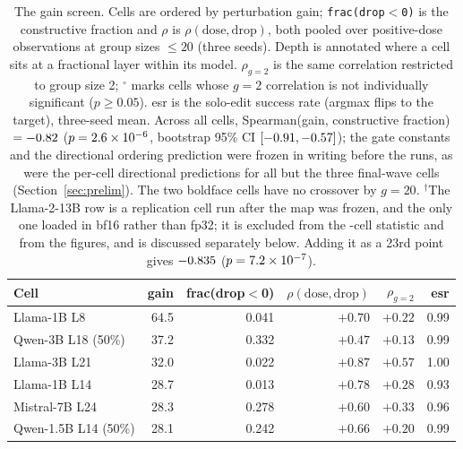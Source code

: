 \documentclass[preprint,12pt]{elsarticle}
\theoremstyle{definition}
\begin{document}
\begin{table}[t]
\centering
\caption{The gain screen. Cells are ordered by perturbation gain; \texttt{frac(drop$<$0)}
is the constructive fraction and $\rho$ is $\rho(\mathrm{dose},\mathrm{drop})$, both
pooled over positive-dose observations at group sizes $\leq 20$ (three seeds). Depth is
annotated where a cell sits at a fractional layer within its model. $\rho_{g=2}$ is
the same correlation restricted to group size 2; $^{\circ}$ marks cells whose
$g{=}2$ correlation is not individually significant ($p\geq0.05$). esr is the
solo-edit success rate (argmax flips to the target), three-seed mean.
Across all \nCells{} cells, Spearman(gain, constructive fraction) $=-0.82{}$
($p=2.6\times10^{-6}{}$, bootstrap 95\% CI $[-0.91,-0.57]{}$); the gate constants and the
directional ordering prediction were frozen in writing before the runs, as were the
per-cell directional predictions for all but the three final-wave cells
(Section~\ref{sec:prelim}). The two boldface cells have no crossover by $g{=}20$.
$^{\dagger}$The Llama-2-13B row is a replication cell run after the map was frozen, and
the only one loaded in bf16 rather than fp32; it is excluded from the \nCells{}-cell
statistic and from the figures, and is discussed separately below. Adding it as a 23rd
point gives $-0.835{}$ ($p=7.2\times10^{-7}{}$).}
\label{tab:gain}
{\small
\begin{tabular}{lrrrrr}
\toprule
Cell & gain & frac(drop$<$0) & $\rho(\mathrm{dose},\mathrm{drop})$ & $\rho_{g=2}$ & esr \\
\midrule
Llama-1B L8         & 64.5 & 0.041 & $+0.70$ & $+0.22$ & 0.99 \\
Qwen-3B L18 (50\%)  & 37.2 & 0.332 & $+0.47$ & $+0.13$ & 0.99 \\
Llama-3B L21        & 32.0 & 0.022 & $+0.87$ & $+0.57$ & 1.00 \\
Llama-1B L14        & 28.7 & 0.013 & $+0.78$ & $+0.28$ & 0.93 \\
Mistral-7B L24      & 28.3 & 0.278 & $+0.60$ & $+0.33$ & 0.96 \\
Qwen-1.5B L14 (50\%)& 28.1 & 0.242 & $+0.66$ & $+0.20$ & 0.99 \\

\end{tabular}}
\end{table}
\end{document}
